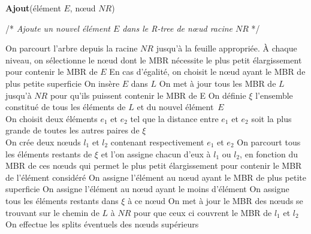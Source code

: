 \begin{algorithm}
\caption{\textbf{Ajout}(élément $E$, nœud $NR$)}
/* \textit{Ajoute un nouvel élément $E$ dans le R-tree de nœud racine $NR$} */
\label{algo:ajout}
\begin{algorithmic}[1]
\STATE On parcourt l'arbre depuis la racine $NR$ jusqu'à la feuille appropriée. À chaque niveau, on sélectionne le nœud dont le MBR nécessite le plus petit élargissement pour contenir le MBR de $E$
\STATE En cas d'égalité, on choisit le nœud ayant le MBR de plus petite \og superficie \fg{}
  \STATE On insère $E$ dans $L$
  \STATE On met à jour tous les MBR de $L$ jusqu'à $NR$ pour qu'ils puissent contenir le MBR de E 
  \STATE On définie $\xi$ l'ensemble constitué de tous les éléments de $L$ et du nouvel élément~$E$\\
On choisit deux éléments $e_1$ et $e_2$ tel que la distance entre $e_1$ et $e_2$ soit la plus grande de toutes les autres paires de $\xi$\\
On crée deux nœuds $l_1$ et $l_2$ contenant respectivement $e_1$ et $e_2$
  \STATE On parcourt tous les éléments restants de $\xi$ et l'on assigne chacun d'eux à $l_1$ ou $l_2$, en fonction du MBR de ces nœuds qui permet le plus petit élargissement pour contenir le MBR de l'élément considéré
    \STATE On assigne l'élément au nœud ayant le MBR de plus petite superficie
      \STATE On assigne l'élément au nœud ayant le moins d'élément
    \ENDIF
  \ENDIF
    \STATE On assigne tous les éléments restants dans $\xi$ à ce nœud
  \ENDIF
  \STATE On met à jour le MBR des nœuds se trouvant sur le chemin de $L$ à $NR$ pour que ceux ci couvrent le MBR de $l_1$ et $l_2$
  \STATE On effectue les \og splits \fg{} éventuels des nœuds supérieurs
\ENDIF 
\end{algorithmic}
\end{algorithm}
